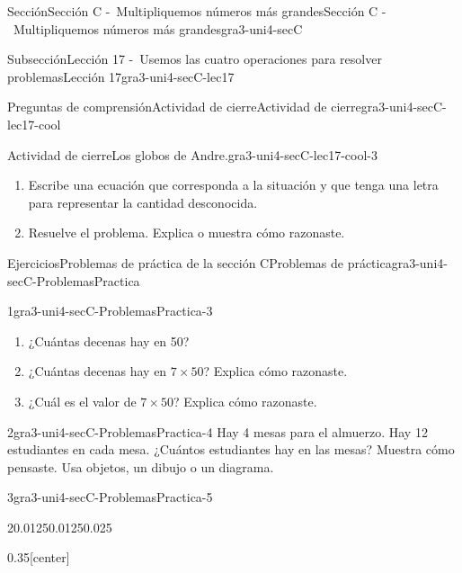 \documentclass[twoside,10pt,]{article}
\begin{document}
\begin{sectionptx}{Sección}{Sección C -~Multipliquemos números más grandes}{}{Sección C -~Multipliquemos números más grandes}{}{}{gra3-uni4-secC}
\begin{subsectionptx}{Subsección}{Lección 17 -~Usemos las cuatro operaciones para resolver problemas}{}{Lección 17}{}{}{gra3-uni4-secC-lec17}
\begin{reading-questions-subsubsection}{Preguntas de comprensión}{Actividad de cierre}{}{Actividad de cierre}{}{}{gra3-uni4-secC-lec17-cool}
\begin{project}{Actividad de cierre}{Los globos de Andre.}{gra3-uni4-secC-lec17-cool-3}
\begin{enumerate}[label=(\alph*)]
\item{}Escribe una ecuación que corresponda a la situación y que tenga una letra para representar la cantidad desconocida.%
\item{}Resuelve el problema. Explica o muestra cómo razonaste.%
\end{enumerate}
\end{project}%
\end{reading-questions-subsubsection}
\end{subsectionptx}
%
%
\typeout{************************************************}
\typeout{************************************************}
%
\begin{exercises-subsection}{Ejercicios}{Problemas de práctica de la sección C}{}{Problemas de práctica}{}{}{gra3-uni4-secC-ProblemasPractica}
\begin{divisionexercise}{1}{}{}{gra3-uni4-secC-ProblemasPractica-3}%
%
\begin{enumerate}[label=(\alph*)]
\item{}¿Cuántas decenas hay en 50?%
\item{}¿Cuántas decenas hay en \(7 \times 50\)? Explica cómo razonaste.%
\item{}¿Cuál es el valor de \(7 \times 50\)? Explica cómo razonaste.%
\end{enumerate}
\end{divisionexercise}%
\begin{divisionexercise}{2}{}{}{gra3-uni4-secC-ProblemasPractica-4}%
Hay 4 mesas para el almuerzo. Hay 12 estudiantes en cada mesa. ¿Cuántos estudiantes hay en las mesas? Muestra cómo pensaste. Usa objetos, un dibujo o un diagrama.%
\end{divisionexercise}%
\begin{divisionexercise}{3}{}{}{gra3-uni4-secC-ProblemasPractica-5}%
\begin{sidebyside}{2}{0.0125}{0.0125}{0.025}%
\begin{sbspanel}{0.35}[center]%

\end{sbspanel}
\end{sidebyside}
\end{divisionexercise}
\end{exercises-subsection}
\end{sectionptx}
\end{document}
